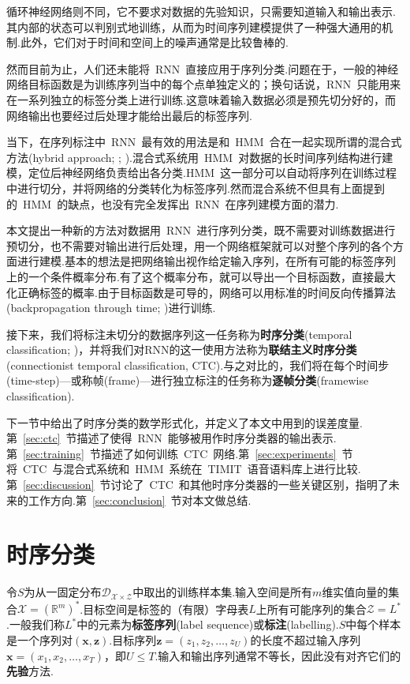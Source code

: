 \documentclass{ctexart}
\def\bR{\mathbb{R}}
\def\cD{\mathcal{D}}
\def\cX{\mathcal{X}}
\def\cZ{\mathcal{Z}}
\def\vx{\mathbf{x}}
\def\vz{\mathbf{z}}
\begin{document}
循环神经网络则不同，它不要求对数据的先验知识，只需要知道输入和输出表示.其内部的状态可以判别式地训练，从而为时间序列建模提供了一种强大通用的机制.此外，它们对于时间和空间上的噪声通常是比较鲁棒的.

然而目前为止，人们还未能将~RNN~直接应用于序列分类.问题在于，一般的神经网络目标函数是为训练序列当中的每个点单独定义的；换句话说，RNN~只能用来在一系列独立的标签分类上进行训练.这意味着输入数据必须是预先切分好的，而网络输出也要经过后处理才能给出最后的标签序列.

当下，在序列标注中~RNN~最有效的用法是和~HMM~合在一起实现所谓的混合式方法(hybrid approach; \citealp{bourlard1994connectionist}; \citealp{bengio1999markovian}).混合式系统用~HMM~对数据的长时间序列结构进行建模，定位后神经网络负责给出各分类.HMM~这一部分可以自动将序列在训练过程中进行切分，并将网络的分类转化为标签序列.然而混合系统不但具有上面提到的~HMM~的缺点，也没有完全发挥出~RNN~在序列建模方面的潜力.

本文提出一种新的方法对数据用~RNN~进行序列分类，既不需要对训练数据进行预切分，也不需要对输出进行后处理，用一个网络框架就可以对整个序列的各个方面进行建模.基本的想法是把网络输出视作给定输入序列，在所有可能的标签序列上的一个条件概率分布.有了这个概率分布，就可以导出一个目标函数，直接最大化正确标签的概率.由于目标函数是可导的，网络可以用标准的时间反向传播算法(backpropagation through time; \citealp{werbos1990bptt})进行训练.

接下来，我们将标注未切分的数据序列这一任务称为\textbf{时序分类}(temporal classification; \citealp{kadous2002temporal})，并将我们对RNN的这一使用方法称为\textbf{联结主义时序分类}(connectionist temporal classification, CTC).与之对比的，我们将在每个时间步(time-step)---或称帧(frame)---进行独立标注的任务称为\textbf{逐帧分类}(framewise classification).

下一节中给出了时序分类的数学形式化，并定义了本文中用到的误差度量.第~\ref{sec:ctc}~节描述了使得~RNN~能够被用作时序分类器的输出表示.第~\ref{sec:training}~节描述了如何训练~CTC~网络.第~\ref{sec:experiments}~节将~CTC~与混合式系统和~HMM~系统在~TIMIT~语音语料库上进行比较.第~\ref{sec:discussion}~节讨论了~CTC~和其他时序分类器的一些关键区别，指明了未来的工作方向.第~\ref{sec:conclusion}~节对本文做总结.
\section{时序分类}
令$S$为从一固定分布$\cD_{\cX\times\cZ}$中取出的训练样本集.输入空间是所有$m$维实值向量的集合$\cX = (\bR^m)^*$.目标空间是标签的（有限）字母表$L$上所有可能序列的集合$\cZ = L^*$.一般我们称$L^*$中的元素为\textbf{标签序列}(label sequence)或\textbf{标注}(labelling).$S$中每个样本是一个序列对$(\vx, \vz)$.目标序列$\vz = (z_1,z_2,\dots, z_U)$的长度不超过输入序列$\vx = (x_1,x_2,\dots,x_T)$，即$U\le T$.输入和输出序列通常不等长，因此没有对齐它们的\textbf{先验}方法.
\end{document}
